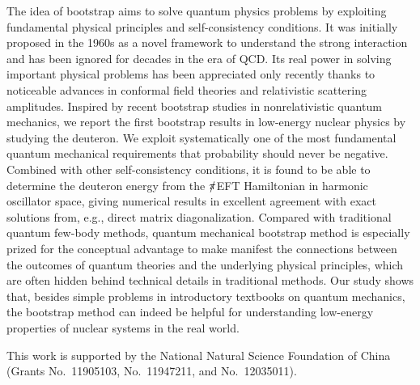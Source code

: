 \documentclass[aps,prc,reprint,superscriptaddress,nofootinbib]{revtex4-2}
\begin{document}
The idea of bootstrap aims to solve quantum physics problems by exploiting fundamental physical principles and self-consistency conditions.
It was initially proposed in the 1960s as a novel framework to understand the strong interaction
and has been ignored for decades in the era of QCD.
Its real power in solving important physical problems has been appreciated only recently
thanks to noticeable advances in conformal field theories and relativistic scattering amplitudes.
Inspired by recent bootstrap studies in nonrelativistic quantum mechanics,
we report the first bootstrap results in low-energy nuclear physics
by studying the deuteron.
We exploit systematically one of the most fundamental quantum mechanical requirements 
that probability should never be negative.
Combined with other self-consistency conditions,
it is found to be able to determine 
the deuteron energy from the $\slashed{\pi}$EFT Hamiltonian in harmonic oscillator space,
giving numerical results in excellent agreement with exact solutions
from, e.g., direct matrix diagonalization.
Compared with traditional quantum few-body methods,
quantum mechanical bootstrap method is especially prized for the conceptual advantage
to make manifest the connections between the outcomes of quantum theories and the underlying 
physical principles,
which are often hidden behind technical details in traditional methods.
Our study shows that, 
besides simple problems in introductory textbooks on quantum mechanics,
the bootstrap method can indeed be helpful for understanding low-energy properties of nuclear systems in the real world.

\begin{acknowledgments}

This work is supported by the National Natural Science Foundation of China (Grants No.\ 11905103, No.\ 11947211, and No.\ 12035011).


\end{acknowledgments}
\end{document}
